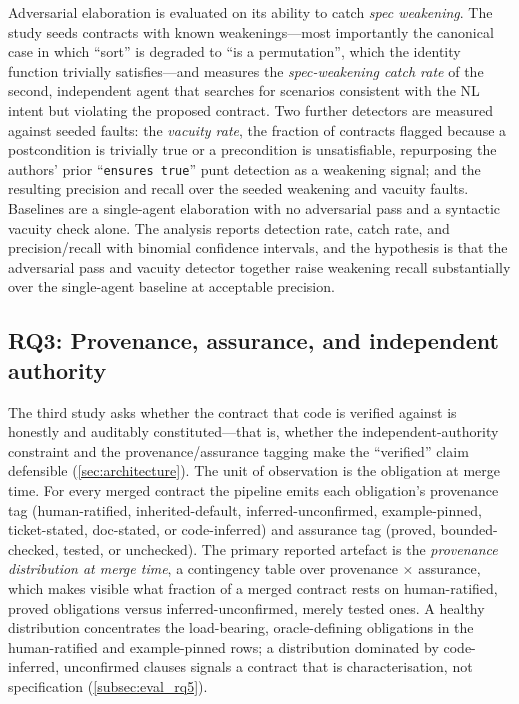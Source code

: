 Adversarial elaboration is evaluated on its ability to catch \emph{spec weakening}. The study seeds contracts with known weakenings---most importantly the canonical case in which ``sort'' is degraded to ``is a permutation'', which the identity function trivially satisfies---and measures the \emph{spec-weakening catch rate} of the second, independent agent that searches for scenarios consistent with the NL intent but violating the proposed contract. Two further detectors are measured against seeded faults: the \emph{vacuity rate}, the fraction of contracts flagged because a postcondition is trivially true or a precondition is unsatisfiable, repurposing the authors' prior ``\texttt{ensures true}'' punt detection as a weakening signal; and the resulting precision and recall over the seeded weakening and vacuity faults. Baselines are a single-agent elaboration with no adversarial pass and a syntactic vacuity check alone. The analysis reports detection rate, catch rate, and precision/recall with binomial confidence intervals, and the hypothesis is that the adversarial pass and vacuity detector together raise weakening recall substantially over the single-agent baseline at acceptable precision.

\subsection{RQ3: Provenance, assurance, and independent authority}\label{subsec:eval_rq3}

The third study asks whether the contract that code is verified against is honestly and auditably constituted---that is, whether the independent-authority constraint and the provenance/assurance tagging make the ``verified'' claim defensible (\cref{sec:architecture}). The unit of observation is the obligation at merge time. For every merged contract the pipeline emits each obligation's provenance tag (human-ratified, inherited-default, inferred-unconfirmed, example-pinned, ticket-stated, doc-stated, or code-inferred) and assurance tag (proved, bounded-checked, tested, or unchecked). The primary reported artefact is the \emph{provenance distribution at merge time}, a contingency table over provenance $\times$ assurance, which makes visible what fraction of a merged contract rests on human-ratified, proved obligations versus inferred-unconfirmed, merely tested ones. A healthy distribution concentrates the load-bearing, oracle-defining obligations in the human-ratified and example-pinned rows; a distribution dominated by code-inferred, unconfirmed clauses signals a contract that is characterisation, not specification (\cref{subsec:eval_rq5}).

